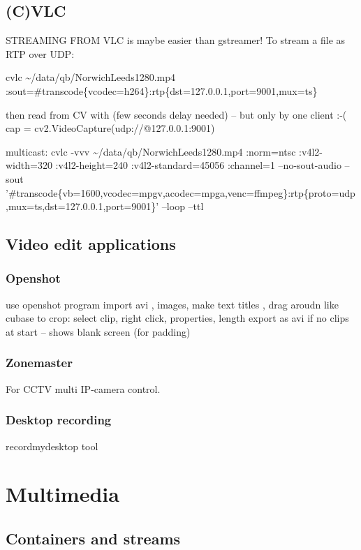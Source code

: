\documentclass[oneside,english]{scrbook}
\begin{document}
\chapter{(C)VLC}

STREAMING FROM VLC is maybe easier than gstreamer! To stream a file
as RTP over UDP:

cvlc \textasciitilde{}/data/qb/NorwichLeeds1280.mp4 :sout=\#transcode\{vcodec=h264\}:\textquotedbl{}rtp\{dst=127.0.0.1,port=9001,mux=ts\}\textquotedbl{}

then read from CV with (few seconds delay needed) -- but only by one
client :-( cap = cv2.VideoCapture(\textquotedbl{}udp://@127.0.0.1:9001\textquotedbl{})

multicast: cvlc -vvv \textasciitilde{}/data/qb/NorwichLeeds1280.mp4
:norm=ntsc :v4l2-width=320 :v4l2-height=240 :v4l2-standard=45056 :channel=1
--no-sout-audio --sout '\#transcode\{vb=\textquotedbl{}1600\textquotedbl{},vcodec=mpgv,acodec=mpga,venc=ffmpeg\}:rtp\{proto=udp,mux=ts,dst=127.0.0.1,port=9001\}'
--loop --ttl 

\chapter{Video edit applications}
\section{Openshot}
use openshot program
	import avi , images, make text titles , drag aroudn like cubase
	to crop: select clip, right click, properties, length
	export as avi
	if no clips at start -- shows blank screen (for padding)

\section{Zonemaster}
For CCTV multi IP-camera control.

\section{Desktop recording}
recordmydesktop tool




\part{Multimedia}


\chapter{Containers and streams}
\end{document}
